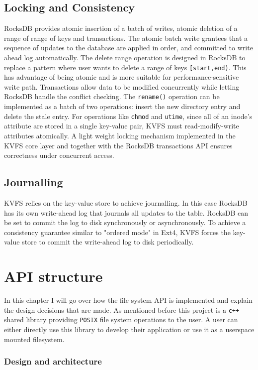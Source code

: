 \documentclass[bsc,frontabs,twoside,singlespacing,parskip,deptreport]{infthesis}     %
\begin{document}
\section{Locking and Consistency}
RocksDB provides atomic insertion of a batch of writes, atomic deletion of a range of range of keys and transactions.  The atomic batch write grantees that a sequence of updates to the database are applied in order, and committed to write ahead log automatically. The delete range operation is designed in RocksDB to replace a pattern where user wants to delete a range of keys {\tt [start,end)}. This has advantage of being atomic and is more suitable for performance-sensitive write path. Transactions allow data to be modified concurrently while letting RocksDB handle the conflict checking.
The {\tt rename()} operation can be implemented as a batch of two operations: insert the new directory entry and delete the stale entry. For operations like {\tt chmod} and {\tt utime}, since all of an inode's attribute are stored in a single key-value pair, KVFS must read-modify-write attributes atomically. A light weight locking mechanism implemented in the KVFS core layer and together with the RocksDB transactions API ensures correctness under concurrent access.

\section{Journalling}
KVFS relies on the key-value store to achieve journalling. In this case RocksDB has its own write-ahead log that journals all updates to the table. RocksDB can be set to commit the log to disk synchronously or asynchronously. To achieve a consistency  guarantee similar to "ordered mode" in Ext4, KVFS forces the key-value store to commit the write-ahead log to disk periodically.


\chapter{API structure}
In this chapter I will go over how the file system API is implemented and explain the design decisions that are made. As mentioned before this project is a {\tt c++} shared library providing {\tt POSIX} file system operations to the user. A user can either directly use this library to develop their application or use it as a userspace mounted filesystem.

\subsection{Design and architecture}
\end{document}
